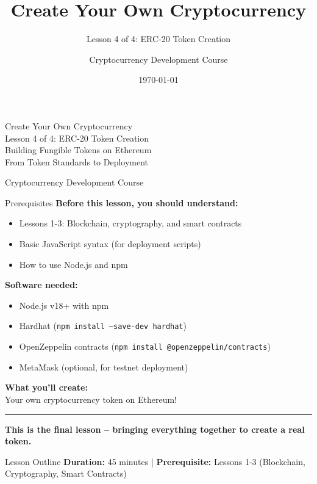 \documentclass[8pt,aspectratio=169]{beamer}
\title{Create Your Own Cryptocurrency}
\subtitle{Lesson 4 of 4: ERC-20 Token Creation}
\author{Cryptocurrency Development Course}
\institute{From Theory to Practice}
\date{\today}
\newcommand{\bottomnote}[1]{%
\vfill
\vspace{-2mm}
\textcolor{mllavender2}{\rule{\textwidth}{0.4pt}}
\vspace{1mm}
\footnotesize
\textbf{#1}
}
\begin{document}
\begin{frame}[plain]
\vspace{1.5cm}
\begin{center}
{\Huge Create Your Own Cryptocurrency}\\[0.5cm]
{\Large Lesson 4 of 4: ERC-20 Token Creation}\\[1.5cm]
{\normalsize Building Fungible Tokens on Ethereum}\\[0.5cm]
{\small From Token Standards to Deployment}
\end{center}
\vfill
\begin{center}
\textcolor{mlgray}{\small Cryptocurrency Development Course}
\end{center}
\end{frame}

\begin{frame}{Prerequisites}
\textbf{Before this lesson, you should understand:}
\begin{itemize}
\item Lessons 1-3: Blockchain, cryptography, and smart contracts
\item Basic JavaScript syntax (for deployment scripts)
\item How to use Node.js and npm
\end{itemize}

\vspace{1em}
\textbf{Software needed:}
\begin{itemize}
\item Node.js v18+ with npm
\item Hardhat (\texttt{npm install --save-dev hardhat})
\item OpenZeppelin contracts (\texttt{npm install @openzeppelin/contracts})
\item MetaMask (optional, for testnet deployment)
\end{itemize}

\vspace{1em}
\textbf{What you'll create:}\\
Your own cryptocurrency token on Ethereum!

\bottomnote{This is the final lesson -- bringing everything together to create a real token.}
\end{frame}

\begin{frame}[t]{Lesson Outline}
\tableofcontents
\vfill
\footnotesize
\textbf{Duration:} 45 minutes | \textbf{Prerequisite:} Lessons 1-3 (Blockchain, Cryptography, Smart Contracts)
\end{frame}
\end{document}
